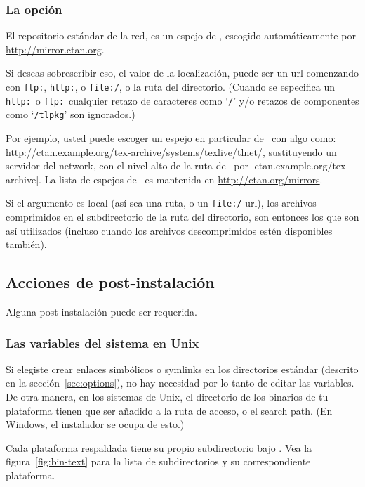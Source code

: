 \documentclass{article}
\begin{document}
\subsubsection{La opción }
\label{sec:location}

El repositorio estándar de la red, es un espejo de \CTAN{}, escogido
automáticamente por \url{http://mirror.ctan.org}.

Si deseas sobrescribir eso, el valor de la localización, puede ser un
url comenzando con \texttt{ftp:}, \texttt{http:}, o \texttt{file:/}, o
la ruta del directorio. (Cuando se especifica un \texttt{http:}\ o
\texttt{ftp:}\ cualquier retazo de caracteres como `\texttt{/}' y/o
retazos de componentes como `\texttt{/tlpkg}' son ignorados.)

Por ejemplo, usted puede escoger un espejo en particular de \CTAN\ con
algo como:
\url{http://ctan.example.org/tex-archive/systems/texlive/tlnet/},
sustituyendo un servidor del network, con el nivel alto de la ruta de
\CTAN\ por |ctan.example.org/tex-archive|. La lista de espejos de
\CTAN\ es mantenida en \url{http://ctan.org/mirrors}.

Si el argumento es local (así sea una ruta, o un \texttt{file:/} url),
los archivos comprimidos en el subdirectorio  de la ruta
del directorio, son entonces los que son así utilizados (incluso cuando los archivos
descomprimidos estén disponibles también). 

\subsection{Acciones de post-instalación}
\label{sec:postinstall}

Alguna post-instalación puede ser requerida.

\subsubsection{Las variables del sistema en Unix}
\label{sec:env}

Si elegiste crear enlaces simbólicos o symlinks en los directorios
estándar (descrito en la sección~\ref{sec:options}), no hay necesidad
por lo tanto de editar las variables. De otra manera, en los sistemas
de Unix, el directorio de los binarios de tu plataforma tienen que ser
añadido a la ruta de acceso, o el search path. (En Windows, el
instalador se ocupa de esto.)

Cada plataforma respaldada tiene su propio subdirectorio bajo
. Vea la figura~\ref{fig:bin-text} para la lista
de subdirectorios y su correspondiente plataforma. 
\end{document}
